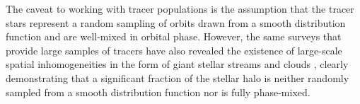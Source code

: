 \documentclass[preprint]{aastex}
\begin{document}
The caveat to working with tracer populations is the assumption that the tracer stars represent a random sampling of orbits drawn from a smooth distribution function and are well-mixed in orbital phase. However, the same surveys that provide large samples of tracers have also revealed the existence of large-scale spatial inhomogeneities in the form of giant stellar streams and clouds \citep{newberg02,majewski03,belokurov06}, clearly demonstrating that a significant fraction of the stellar halo is neither randomly sampled from a smooth distribution function nor is fully phase-mixed.
\end{document}
